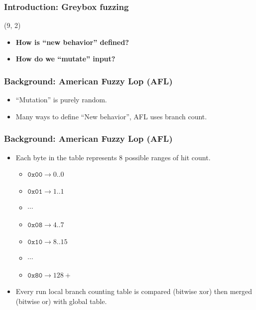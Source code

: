 \begin{frame}
	\frametitle{Introduction: Greybox fuzzing}
	
	\begin{textblock}{8}(9, 2)
		\begin{itemize}
			\item \textbf{How is ``new behavior'' defined?}
			\item \textbf{How do we ``mutate'' input?}
		\end{itemize}
	\end{textblock}
\end{frame}
\begin{frame}
	\frametitle{Background: American Fuzzy Lop (AFL) }
	\begin{itemize}
		\item``Mutation'' is purely random.
		\item Many ways to define ``New behavior'', AFL uses branch count.
	\end{itemize}
	\pause
	
\end{frame}
\begin{frame}
	\frametitle{Background: American Fuzzy Lop (AFL)}
	\begin{minipage}[t]{0.49\linewidth}
		\begin{itemize}
			\item Each byte in the table represents 8 possible ranges of hit count.
			      \begin{itemize}
				      \item $\texttt{0x00} \rightarrow 0..0 $
				      \item $\texttt{0x01} \rightarrow 1..1 $
				      \item $\cdots$
				      \item $\texttt{0x08} \rightarrow 4..7 $
				      \item $\texttt{0x10} \rightarrow 8..15 $
				      \item $\cdots$
				      \item $\texttt{0x80} \rightarrow 128+$
			      \end{itemize}
			\item Every run local branch counting table is compared (bitwise xor) then merged (bitwise or) with global table.
		\end{itemize}
	\end{minipage}
	\hfill
	\begin{minipage}[t]{0.49\linewidth}
		\begin{figure}[t]
			\centering
			
		\end{figure}
	\end{minipage}
\end{frame}

